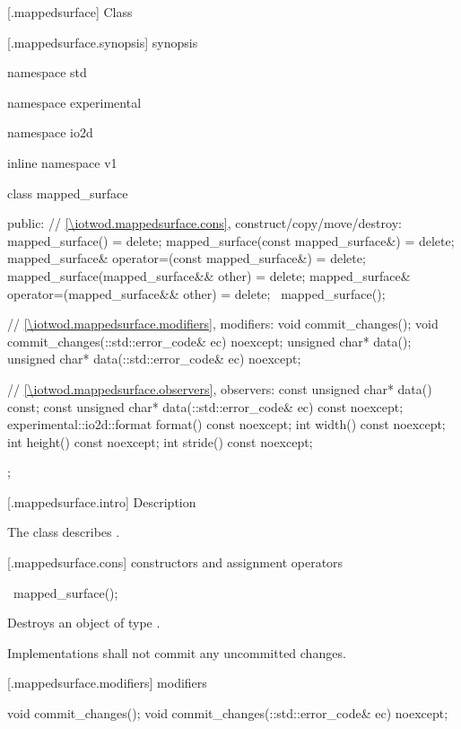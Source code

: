  [\iotwod.mappedsurface] {Class }

 [\iotwod.mappedsurface.synopsis] { synopsis}

\begin{codeblock}
namespace std { namespace experimental { namespace io2d { inline namespace v1 {
  class mapped_surface {
  public:
    // \ref{\iotwod.mappedsurface.cons}, construct/copy/move/destroy:
    mapped_surface() = delete;
    mapped_surface(const mapped_surface&) = delete;
    mapped_surface& operator=(const mapped_surface&) = delete;
    mapped_surface(mapped_surface&& other) = delete;
    mapped_surface& operator=(mapped_surface&& other) = delete;
    ~mapped_surface();
    
    // \ref{\iotwod.mappedsurface.modifiers}, modifiers:
    void commit_changes();
    void commit_changes(::std::error_code& ec) noexcept;
    unsigned char* data();
    unsigned char* data(::std::error_code& ec) noexcept;
    
    // \ref{\iotwod.mappedsurface.observers}, observers:
    const unsigned char* data() const;
    const unsigned char* data(::std::error_code& ec) const noexcept;
    experimental::io2d::format format() const noexcept;
    int width() const noexcept;
    int height() const noexcept;
    int stride() const noexcept;
  };
} } } }
\end{codeblock}

 [\iotwod.mappedsurface.intro] { Description}

\pnum
{}
The class  describes .

 [\iotwod.mappedsurface.cons] { constructors and assignment operators}

\begin{itemdecl}
    ~mapped_surface();
\end{itemdecl}
\begin{itemdescr}
	\pnum
	\effects
	Destroys an object of type . 
	
	\pnum
	\remarks
	Implementations shall not commit any uncommitted changes.
		
\end{itemdescr}

 [\iotwod.mappedsurface.modifiers]{ modifiers}

\begin{itemdecl}
    void commit_changes();
    void commit_changes(::std::error_code& ec) noexcept;
\end{itemdecl}
\begin{itemdescr}
	\pnum
	\postconditions
	
\end{itemdescr}

